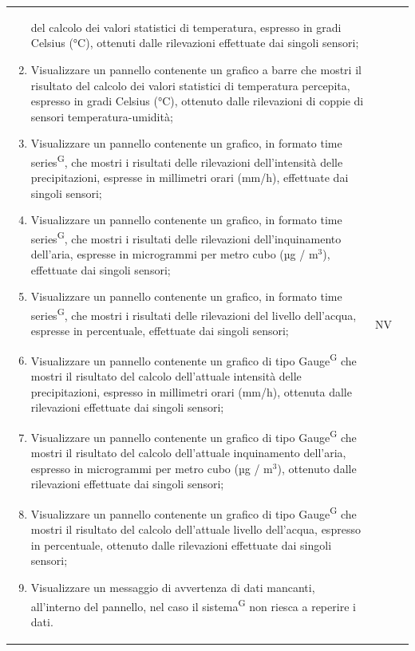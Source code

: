\documentclass[8pt]{article}
\newcommand{\glossterm}[1]{#1\textsuperscript{G}} %
\begin{document}
\begin{longtable}{|>{\centering}p{2cm}|>{\RaggedRight}m{12cm}|>{\centering\arraybackslash}p{2cm}|}
\begin{enumerate}[start=8]
            del calcolo dei valori statistici di temperatura, espresso in gradi Celsius (°C), ottenuti dalle rilevazioni effettuate dai singoli sensori;
        \item Visualizzare un pannello contenente un grafico a barre che mostri il risultato
            del calcolo dei valori statistici di temperatura percepita, espresso in gradi Celsius (°C), ottenuto dalle rilevazioni di coppie di sensori temperatura-umidità;
        \item Visualizzare un pannello contenente un grafico, in formato \glossterm{time series}, che mostri i
            risultati delle rilevazioni dell’intensità delle precipitazioni, espresse in millimetri orari (mm/h), effettuate dai
            singoli sensori;
        \item Visualizzare un pannello contenente un grafico, in formato \glossterm{time series}, che mostri i
            risultati delle rilevazioni dell’inquinamento dell'aria, espresse in microgrammi per metro cubo (µg / $\mbox{m}^{\mbox{3}}$), effettuate dai
            singoli sensori;
        \item Visualizzare un pannello contenente un grafico, in formato \glossterm{time series}, che mostri i
            risultati delle rilevazioni del livello dell'acqua, espresse in percentuale, effettuate dai
            singoli sensori;
        \item Visualizzare un pannello contenente un grafico di tipo \glossterm{Gauge} che mostri il risultato
            del calcolo dell'attuale intensità delle precipitazioni, espresso in millimetri orari (mm/h), ottenuta dalle rilevazioni effettuate dai singoli sensori;
        \item Visualizzare un pannello contenente un grafico di tipo \glossterm{Gauge} che mostri il risultato
            del calcolo dell'attuale inquinamento dell'aria, espresso in microgrammi per metro cubo (µg / $\mbox{m}^{\mbox{3}}$), ottenuto dalle rilevazioni effettuate dai singoli sensori;
        \item Visualizzare un pannello contenente un grafico di tipo \glossterm{Gauge} che mostri il risultato
            del calcolo dell'attuale livello dell'acqua, espresso in percentuale, ottenuto dalle rilevazioni effettuate dai singoli sensori;
        \item Visualizzare un messaggio di avvertenza di dati mancanti, all’interno del pannello, nel caso il \glossterm{sistema} non riesca a reperire i dati.
    \end{enumerate}
    & NV \\

\end{longtable}
\end{document}
